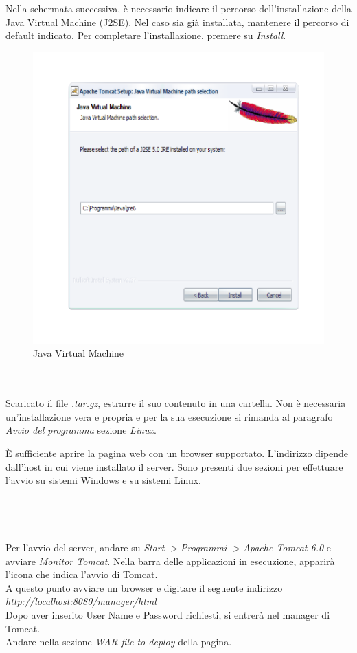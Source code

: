 Nella schermata successiva, \`e necessario indicare il percorso dell'installazione della Java Virtual Machine (J2SE). Nel caso sia gi\` a installata, mantenere il percorso di default indicato.
Per completare l'installazione, premere su \textit{Install}.

\begin{figure}[!ht]
\centering
\includegraphics[scale=0.7]{images/InstallTomcat4.png}
\caption{Java Virtual Machine}
\end{figure} 

\\
\\
Scaricato il file \textit{.tar.gz}, estrarre il suo contenuto in una cartella.
Non \`e necessaria un'installazione vera e propria e per la sua esecuzione si rimanda al paragrafo \textit{Avvio del programma} sezione \textit{Linux}.

\`E sufficiente aprire la pagina web con un browser supportato. L'indirizzo dipende dall'host in cui viene installato il server.
Sono presenti due sezioni per effettuare l'avvio su sistemi Windows e su sistemi Linux.\\
\\\\
\\
\\
Per l'avvio del server, andare su \textit{Start-$ > $Programmi-$ > $Apache Tomcat 6.0} e avviare \textit{Monitor Tomcat}.
Nella barra delle applicazioni in esecuzione, apparir\`a l'icona che indica l'avvio di Tomcat.\\
A questo punto avviare un browser e digitare il seguente indirizzo\\ \textit{http://localhost:8080/manager/html}\\
Dopo aver inserito User Name e Password richiesti, si entrer\`a nel manager di Tomcat.\\
Andare nella sezione \textit{WAR file to deploy} della pagina.\\

